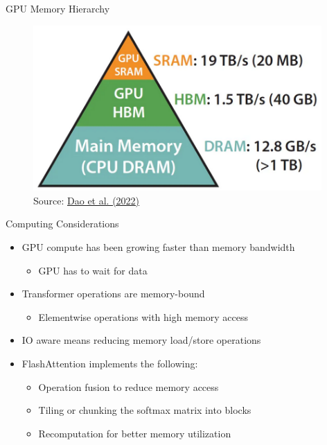 
\begin{vbframe}{GPU Memory Hierarchy}

\vfill

\begin{figure}
	\centering
	\includegraphics[width = 11cm]{./figure/gpu_mem.png} \\ 
	{\footnotesize Source: \href{https://arxiv.org/abs/2205.14135}{Dao et al. (2022)}}
\end{figure}

\vfill

\end{vbframe}


\begin{vbframe}{Computing Considerations}

\vfill

\begin{itemize}
	\item GPU compute has been growing faster than memory bandwidth
	\begin{itemize}
		\item GPU has to wait for data
	\end{itemize}
	\item Transformer operations are memory-bound
	\begin{itemize}
		\item Elementwise operations with high memory access
	\end{itemize}
	\item IO aware means reducing memory load/store operations
	\item FlashAttention implements the following:
	\begin{itemize}
		\item Operation fusion to reduce memory access
		\item Tiling or chunking the softmax matrix into blocks
		\item Recomputation for better memory utilization
	\end{itemize}
\end{itemize}

\vfill

\end{vbframe}

